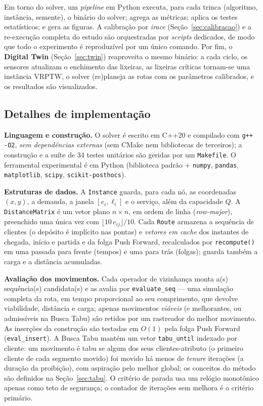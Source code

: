 \documentclass[12pt, a4paper]{article}
\begin{document}
Em torno do solver, um \emph{pipeline} em Python executa, para cada trinca (algoritmo, instância, semente), o binário do solver; agrega as métricas; aplica os testes estatísticos; e gera as figuras. A calibração por \textit{irace} (Seção~\ref{sec:calibracao}) e a re-execução completa do estudo são orquestradas por \textit{scripts} dedicados, de modo que todo o experimento é reproduzível por um único comando. Por fim, o \textbf{Digital Twin} (Seção~\ref{sec:twin}) reaproveita o mesmo binário: a cada ciclo, os sensores atualizam o enchimento das lixeiras, as lixeiras críticas tornam-se uma instância VRPTW, o solver (re)planeja as rotas com os parâmetros calibrados, e os resultados são visualizados.

\subsection{Detalhes de implementação}\label{sec:implementacao}
\textbf{Linguagem e construção.} O solver é escrito em C++20 e compilado com \texttt{g++ -O2}, \emph{sem dependências externas} (sem CMake nem bibliotecas de terceiros); a construção e a suíte de 34 testes unitários são geridas por um \texttt{Makefile}. O ferramental experimental é em Python (biblioteca padrão $+$ \texttt{numpy}, \texttt{pandas}, \texttt{matplotlib}, \texttt{scipy}, \texttt{scikit-posthocs}).

\textbf{Estruturas de dados.} A \texttt{Instance} guarda, para cada nó, as coordenadas $(x,y)$, a demanda, a janela $[e_i,\ell_i]$ e o serviço, além da capacidade $Q$. A \texttt{DistanceMatrix} é um vetor plano $n\times n$, em ordem de linha (\textit{row-major}), preenchido uma única vez com $\lfloor 10\,e_{ij}\rfloor/10$. Cada \texttt{Route} armazena a sequência de clientes (o depósito é implícito nas pontas) e \emph{vetores em cache} dos instantes de chegada, início e partida e da folga Push Forward, recalculados por \texttt{recompute()} em uma passada para frente (tempos) e uma para trás (folgas); guarda também a carga e a distância acumuladas.

\textbf{Avaliação dos movimentos.} Cada operador de vizinhança monta a(s) sequência(s) candidata(s) e as avalia por \texttt{evaluate\_seq} --- uma simulação completa da rota, em tempo proporcional ao seu comprimento, que devolve viabilidade, distância e carga; apenas movimentos \emph{viáveis} (e melhorantes, ou admissíveis na Busca Tabu) são retidos por um rastreador do melhor movimento. As inserções da construção são testadas em $O(1)$ pela folga Push Forward (\texttt{eval\_insert}). A Busca Tabu mantém um vetor \texttt{tabu\_until} indexado por cliente: um movimento é tabu se algum dos seus clientes-atributo (o primeiro cliente de cada segmento movido) foi movido há menos de \textit{tenure} iterações (a duração da proibição), com aspiração pelo melhor global; os conceitos do método são definidos na Seção~\ref{sec:tabu}. O critério de parada usa um relógio monotônico apenas como teto de segurança; o contador de iterações sem melhora é o critério primário.
\end{document}
